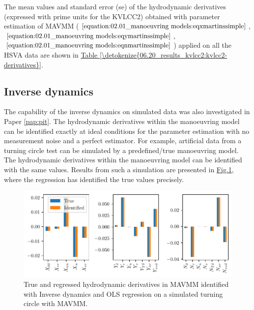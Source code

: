 
\noindent The mean values and standard error (se) of the hydrodynamic derivatives (expressed with prime units for the KVLCC2) obtained with parameter estimation of MAVMM (\(\autoref{equation:02.01_manoeuvring models:eqxmartinssimple}\), \(\autoref{equation:02.01_manoeuvring models:eqymartinssimple}\), \(\autoref{equation:02.01_manoeuvring models:eqnmartinssimple}\)) applied on all the HSVA data are shown in \hyperref[\detokenize{06.20_results_kvlcc2:kvlcc2-derivatives}]{Table \ref{\detokenize{06.20_results_kvlcc2:kvlcc2-derivatives}}}.


\newpage
\clearpage
\subsection{Inverse dynamics}
\label{\detokenize{06.40_results_inverse_dynamics:inverse-dynamics}}\label{\detokenize{06.40_results_inverse_dynamics::doc}}
The capability of the inverse dynamics on simulated data was also investigated in Paper \ref{pap:pit}. The hydrodynamic derivatives within the manoeuvring model can be identified exactly at ideal conditions for the parameter estimation with no measurement noise and a perfect estimator. For example, artificial data from a turning circle test can be simulated by a predefined/true manoeuvring model. The hydrodynamic derivatives within the manoeuvring model can be identified with the same values. Results from such a simulation are presented in \hyperref[\detokenize{06.40_results_inverse_dynamics:fig-bar-parameters}]{Fig.\@ \ref{\detokenize{06.40_results_inverse_dynamics:fig-bar-parameters}}}, where the regression has identified the true values precisely.
\begin{figure}[h!]
\centering
\includegraphics{kappa/images/5.pdf}
\caption{True and regressed hydrodynamic derivatives in MAVMM identified with Inverse dynamics and OLS regression on a simulated turning circle with MAVMM.}\label{\detokenize{06.40_results_inverse_dynamics:fig-bar-parameters}}\end{figure}


